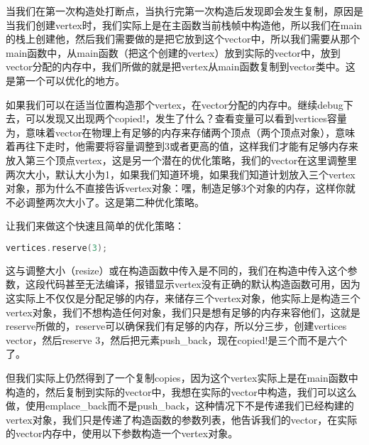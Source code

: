 当我们在第一次构造处打断点，当执行完第一次构造后发现即会发生复制，原因是当我们创建{\ncodestyle vertex}时，我们实际上是在主函数当前栈帧中构造他，所以我们在{\ncodestyle main}的栈上创建他，然后我们需要做的是把它放到这个{\ncodestyle vector}中，所以我们需要从那个{\ncodestyle main}函数中，从{\ncodestyle main}函数（把这个创建的{\ncodestyle vertex}）放到实际的{\ncodestyle vector}中，放到{\ncodestyle vector}分配的内存中，我们所做的就是把{\ncodestyle vertex}从{\ncodestyle main}函数复制到{\ncodestyle vector}类中。这是第一个可以优化的地方。

如果我们可以在适当位置构造那个{\ncodestyle vertex}，在{\ncodestyle vector}分配的内存中。继续{\ncodestyle debug}下去，可以发现又出现两个{\ncodestyle copied!}，发生了什么？查看变量可以看到{\ncodestyle vertices}容量为{}，意味着vector在物理上有足够的内存来存储两个顶点（两个顶点对象），意味着再往下走时，他需要将容量调整到3或者更高的值，这样我们才能有足够内存来放入第三个顶点vertex，这是另一个潜在的优化策略，我们的vector在这里调整里两次大小，默认大小为1，如果我们知道环境，如果我们知道计划放入三个vertex对象，那为什么不直接告诉vertex对象：嘿，制造足够3个对象的内存，这样你就不必调整两次大小了。这是第二种优化策略。

让我们来做这个快速且简单的优化策略：

\begin{lstlisting}[language=c++]
vertices.reserve(3);
\end{lstlisting}

这与调整大小（{\ncodestyle resize}）或在构造函数中传入{}是不同的，我们在构造中传入{}这个参数，这段代码甚至无法编译，报错显示{\ncodestyle vertex}没有正确的默认构造函数可用，因为这实际上不仅仅是分配足够的内存，来储存三个{\ncodestyle vertex}对象，他实际上是构造三个{\ncodestyle vertex}对象，我们不想构造任何对象，我们只是想有足够的内存来容他们，这就是{\ncodestyle reserve}所做的，{\ncodestyle reserve}可以确保我们有足够的内存，所以分三步，创建{\ncodestyle vertices vector}，然后{\ncodestyle reserve 3}，然后把元素{\ncodestyle push_back}，现在{\ncodestyle copied!}是三个而不是六个了。

但我们实际上仍然得到了一个复制{\ncodestyle copies}，因为这个{\ncodestyle vertex}实际上是在{\ncodestyle main}函数中构造的，然后复制到实际的{\ncodestyle vector}中，我想在实际的{\ncodestyle vector}中构造，我们可以这么做，使用{\ncodestyle emplace_back}而不是{\ncodestyle push_back}，这种情况下不是传递我们已经构建的{\ncodestyle vertex}对象，我们只是传递了构造函数的参数列表，他告诉我们的{\ncodestyle vector}，在实际的{\ncodestyle vector}内存中，使用以下参数构造一个{\ncodestyle vertex}对象。

